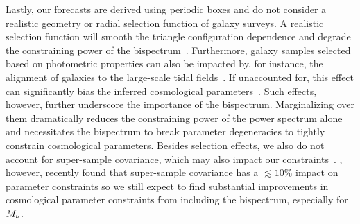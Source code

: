 Lastly, our forecasts are derived using periodic boxes and do not consider a
realistic geometry or radial selection function of galaxy surveys. A realistic 
selection function will smooth the triangle configuration dependence and degrade 
the constraining power of the bispectrum~\citep{sefusatti2005}. Furthermore, galaxy 
samples selected based on photometric properties can also be impacted by, for instance, 
the alignment of galaxies to the large-scale tidal fields~\citep{hirata2009,
krause2011, martens2018, obuljen2019}. If unaccounted for, this effect can
significantly bias the inferred cosmological parameters~\citep{agarwal2020}. 
Such effects, however, further underscore the importance of the bispectrum.
Marginalizing over them dramatically reduces the constraining power of the
power spectrum alone and necessitates the bispectrum to break parameter
degeneracies to tightly constrain cosmological parameters. Besides selection
effects, we also do not account for super-sample covariance, which may also impact 
our constraints~\citep{hamilton2006, sefusatti2006, takada2013, li2018,
wadekar2019}. \cite{wadekar2020}, however, recently found that super-sample
covariance has a $\lesssim10\%$ impact on parameter constraints so we still expect 
to find substantial improvements in cosmological parameter constraints from 
including the bispectrum, especially for $M_\nu$.  




